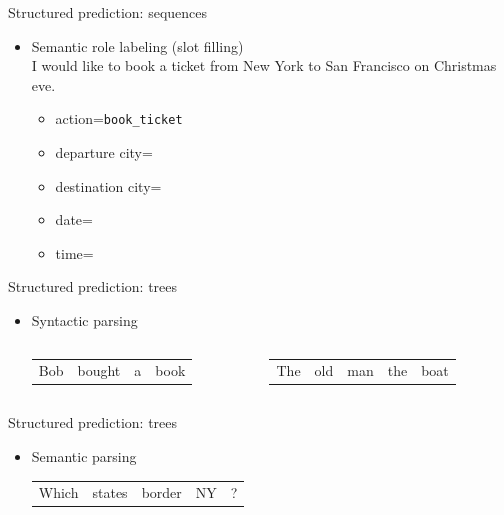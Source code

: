 \documentclass[usenames,dvipsnames,notes]{beamer}
\begin{document}
\begin{frame}
    {Structured prediction: sequences}
    \begin{itemize}
        \item Semantic role labeling (slot filling)\\
            \medskip
            I would like to book a ticket from New York to San Francisco on Christmas eve.
            \begin{itemize}
                \item[]action=\texttt{book\_ticket}
                \item[]departure city=
                \item[]destination city=
                \item[]date=
                \item[]time=
            \end{itemize}
    \end{itemize}
\end{frame}

\begin{frame}
    {Structured prediction: trees}
    \begin{itemize}
        \item Syntactic parsing 
            \vspace{5cm}
            \begin{columns}
                \begin{column}{0.4\linewidth}
                    \begin{tabular}{llll}
                        Bob& bought& a& book
                    \end{tabular}
                \end{column}
                \begin{column}{0.4\linewidth}
                    \begin{tabular}{lllll}
                        The& old& man& the& boat
                    \end{tabular}
                \end{column}
            \end{columns}
    \end{itemize}
\end{frame}

\begin{frame}
    {Structured prediction: trees}
    \begin{itemize}
        \item Semantic parsing \\
            \vspace{5cm}
            \begin{tabular}{lllll}
                Which& states& border& NY& ?
            \end{tabular}
    \end{itemize}
\end{frame}
\end{document}
